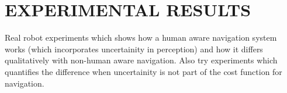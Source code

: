 \section{EXPERIMENTAL RESULTS}
Real robot experiments which shows how a human aware navigation system works (which incorporates uncertainity in perception) and how it differs qualitatively with non-human aware navigation. Also try experiments which quantifies the difference when uncertainity is not part of the cost function for navigation.




